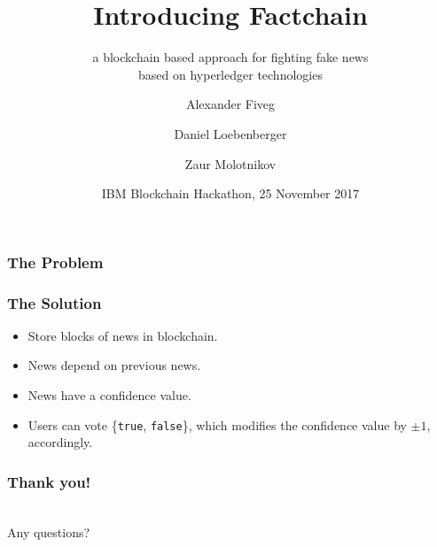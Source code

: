 \documentclass[aspectratio=169]{beamer}
\title{Introducing Factchain}
\subtitle{a blockchain based approach for fighting fake news\\based on hyperledger technologies}
\author{Alexander Fiveg \and Daniel Loebenberger \and Zaur Molotnikov}
\institute{\texttt{\{afiveg,dloeb,zmolo\}@genua.de}}
\date{IBM Blockchain Hackathon, 25 November 2017}
\begin{document}
\frame[plain]{\titlepage}

\begin{frame}
\frametitle{The Problem}

\end{frame}

\begin{frame}
\frametitle{The Solution}

\parbox{12cm}{
\begin{minipage}[c][6cm][c]{7cm}
\begin{itemize}
\item Store blocks of news in blockchain.
\item News depend on previous news.
\item News have a confidence value.
\item Users can vote \{\texttt{true}, \texttt{false}\}, which
      modifies the confidence value by $\pm 1$, accordingly.
\end{itemize}
\end{minipage}
\hfill
\begin{minipage}[c][6cm][c]{3.5cm}
\end{minipage}
}
\end{frame}

\begin{frame}
\frametitle{Thank you!}
\begin{center}
\\
Any questions?
\begin{center}
\end{center}
\end{center}
\end{frame}
\end{document}

